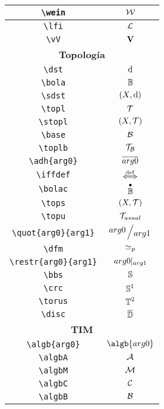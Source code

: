\begin{longtable}{|c|c|}
\verb|\wein| & $\displaystyle\mathcal{W}$ \\ \hline 
\verb|\lfi| & $\displaystyle\mathcal{L}$ \\ \hline 
\verb|\vV| & $\displaystyle\mathbf{V}$ \\ \hline 
\multicolumn{2}{|c|}{\textbf{Topología}} \\ \hline 
\verb|\dst| & $\displaystyle\operatorname{d}$ \\ \hline 
\verb|\bola| & $\displaystyle\mathbb{B}$ \\ \hline 
\verb|\sdst| & $\displaystyle(X,\operatorname{d})$ \\ \hline 
\verb|\topl| & $\displaystyle\mathcal{T}$ \\ \hline 
\verb|\stopl| & $\displaystyle(X, \mathcal{T})$ \\ \hline 
\verb|\base| & $\displaystyle\mathcal{B}$ \\ \hline 
\verb|\toplb| & $\displaystyle\mathcal{T}_{\mathcal{B}}$ \\ \hline 
\verb|\adh{arg0}| & $\displaystyle\overline{arg0}$ \\ \hline 
\verb|\iffdef| & $\displaystyle\overset{\mathrm{def}}{\iff}$ \\ \hline 
\verb|\bolac| & $\displaystyle\overset{\bullet}{\mathbb{B}}$ \\ \hline 
\verb|\tops| & $\displaystyle(X, \mathcal{T})$ \\ \hline 
\verb|\topu| & $\displaystyle\mathcal{T}_{usual}$ \\ \hline 
\verb|\quot{arg0}{arg1}| & $\displaystyle\quot{arg0}{arg1}$ \\ \hline 
\verb|\dfm| & $\displaystyle\simeq_p$ \\ \hline 
\verb|\restr{arg0}{arg1}| & $\displaystyle{arg0}|_{arg1}$ \\ \hline 
\verb|\bbs| & $\displaystyle\mathbb{S}$ \\ \hline 
\verb|\crc| & $\displaystyle\mathbb{S}^1$ \\ \hline 
\verb|\torus| & $\displaystyle\mathbb{T}^2$ \\ \hline 
\verb|\disc| & $\displaystyle\overline{\mathbb{D}}$ \\ \hline 
\multicolumn{2}{|c|}{\textbf{TIM}} \\ \hline 
\verb|\algb{arg0}| & $\displaystyle\algb{arg0}$ \\ \hline 
\verb|\algbA| & $\displaystyle\mathcal{A}$ \\ \hline 
\verb|\algbM| & $\displaystyle\mathcal{M}$ \\ \hline 
\verb|\algbC| & $\displaystyle\mathcal{C}$ \\ \hline 
\verb|\algbB| & $\displaystyle\mathcal{B}$ \\ \hline 

\end{longtable}
